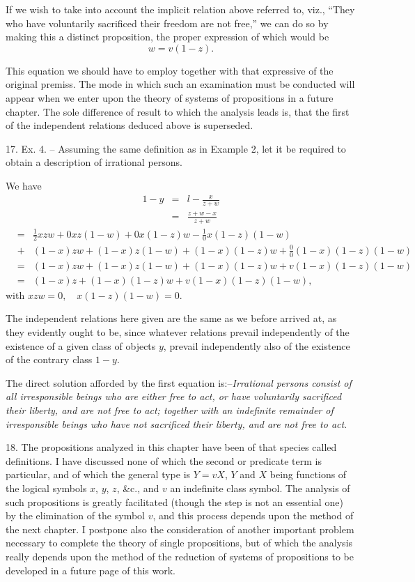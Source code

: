 \documentclass[oneside]{book}
\begin{document}
If we wish to take into account the implicit relation above
referred to, viz., ``They who have voluntarily sacrificed their
freedom are not free,'' we can do so by making this a distinct
proposition, the proper expression of which would be
\[
w = v (1 - z).
\]

This equation we should have to employ together with that
expressive of the original premiss. The mode in which such an
examination must be conducted will appear when we enter upon
the theory of systems of propositions in a future chapter. The
sole difference of result to which the analysis leads is, that the
first of the independent relations deduced above is superseded.

17. Ex. 4. -- Assuming the same definition as in Example 2,
let it be required to obtain a description of irrational persons.

We have
\begin{eqnarray*}
1-y &=& l - \frac{x}{z+w}\\
&=& \frac{z + w - x}{z + w}
\end{eqnarray*}
\begin{eqnarray*}
&=& \frac{1}{2} xzw + 0 xz (1 - w) + 0 x (1 - z) w - \frac{1}{0} x (1 - z) (1 - w)\\
&+& (1-x)zw + (1-x)z(1-w) + (1-x)(1-z)w + \frac{0}{0}(1-x)(1-z)(1-w)\\
&=& (1-x)zw + (1-x)z(1-w) + (1-x)(1-z)w + v(1-x)(1-z)(1-w)\\
&=& (1-x)z + (1-x)(1-z)w + v(1-x)(1-z)(1-w),
\end{eqnarray*}
with $xzw = 0, \quad x(1-z)(1-w) = 0$.

The independent relations here given are the same as we
before arrived at, as they evidently ought to be, since whatever
relations prevail independently of the existence of a given class
of objects $y$, prevail independently also of the existence of the
contrary class $1 - y$.

The direct solution afforded by the first equation is:--\textit{Irrational
persons consist of all irresponsible beings who are either free to
act, or have voluntarily sacrificed their liberty, and are not free to
act; together with an indefinite remainder of irresponsible beings
who have not sacrificed their liberty, and are not free to act}.

18. The propositions analyzed in this chapter have been of
that species called definitions. I have discussed none of which
the second or predicate term is particular, and of which the general
type is $Y= vX$, $Y$ and $X$ being functions of the logical
symbols $x$, $y$, $z$, \&c., and $v$ an indefinite class symbol. The analysis
of such propositions is greatly facilitated (though the step
is not an essential one) by the elimination of the symbol $v$, and
this process depends upon the method of the next chapter. I
postpone also the consideration of another important problem
necessary to complete the theory of single propositions, but of
which the analysis really depends upon the method of the reduction
of systems of propositions to be developed in a future page
of this work.
\end{document}
